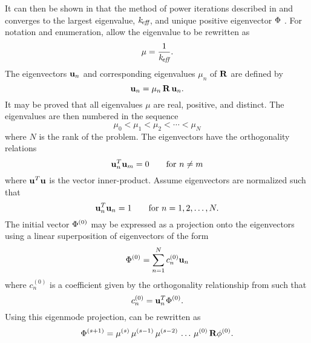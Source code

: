     It can then be shown in that the method of power iterations described in 
     and 
    converges to the largest eigenvalue, $k_{\!\mbox{\scriptsize \em eff}}$, and unique positive 
    eigenvector $\Phi$ \cite{nakamura}. For notation and enumeration, allow the 
    eigenvalue to be rewritten as
    \begin{equation}
      \label{eq:mu}
      \mu = \frac{1}{k_{\!\mbox{\scriptsize \em eff}}}.
    \end{equation}
    The eigenvectors $\mathbf{u}_n$ and
    corresponding eigenvalues $\mu_n$ of $\mathbf{R}$ are defined by
    \begin{equation}
      \label{eq:eigen_definition}
      \mathbf{u}_n = \mu_n \, \mathbf{R} \, \mathbf{u}_n.
    \end{equation}
    It may be proved that all eigenvalues $\mu$ are real, positive, and 
    distinct. The eigenvalues are then numbered in the sequence
    \begin{equation}
      \label{eq:eigen_order}
      \mu_0 < \mu_1 < \mu_2 < \cdots < \mu_N
    \end{equation}
    where $N$ is the rank of the problem. The eigenvectors have the 
    orthogonality relations
    \begin{equation}
      \label{eq:eigen_orthogonality}
      \mathbf{u}^T_n \mathbf{u}_m = 0  \qquad \text{for } n \ne m
    \end{equation}
    where $\mathbf{u}^T \mathbf{u}$ is the vector inner-product. Assume eigenvectors are
    normalized such that
    \begin{equation}
      \label{eq:eigen_normalization}
      \mathbf{u}_n^T \mathbf{u}_n = 1 \qquad \text{for } n = 1, 2, \ldots, N.
    \end{equation}
    The initial vector $\Phi^{(0)}$ may be expressed as a projection onto the
    eigenvectors using a linear superposition of eigenvectors of the form
    \begin{equation}
      \label{eq:eigen_projection}
      \Phi^{(0)} = \sum_{n=1}^{N} c_n^{(0)} \mathbf{u}_n
    \end{equation}
    where $c_n^{(0)}$ is a coefficient given by the orthogonality relationship
    from  such that
    \begin{equation}
      \label{eq:eigen_cn}
      c_n^{(0)} = \mathbf{u}_n^T \Phi^{(0)}.
    \end{equation}
    Using this eigenmode projection,  can be
    rewritten as 
    \begin{equation}
      \label{eq:phi_expand_begin}
      \Phi^{(s+1)} = \mu^{(s)} \, \mu^{(s-1)} \, \mu^{(s-2)} \, 
        \ldots \, \mu^{(0)} \, \mathbf{R} \phi^{(0)}.
    \end{equation}
